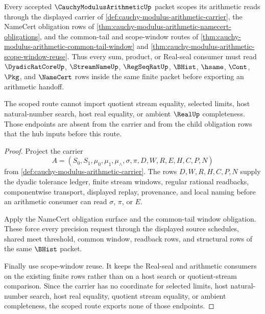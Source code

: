 \begin{theorem}
\label{thm:cauchy-modulus-arithmetic-scoped-route}
Every accepted $\CauchyModulusArithmeticUp$ packet scopes its arithmetic reads through the displayed carrier of \autoref{def:cauchy-modulus-arithmetic-carrier}, the NameCert obligation rows of \autoref{thm:cauchy-modulus-arithmetic-namecert-obligations}, and the common-tail and scope-window routes of \autoref{thm:cauchy-modulus-arithmetic-common-tail-window} and \autoref{thm:cauchy-modulus-arithmetic-scope-window-reuse}. Thus every sum, product, or Real-seal consumer must read $\DyadicRatCoreUp$, $\StreamNameUp$, $\RegSeqRatUp$, $\BHist$, $\hsame$, $\Cont$, $\Pkg$, and $\NameCert$ rows inside the same finite packet before exporting an arithmetic handoff.

The scoped route cannot import quotient stream equality, selected limits, host natural-number search, host real equality, or ambient $\RealUp$ completeness. Those endpoints are absent from the carrier and from the child obligation rows that the hub inputs before this route.
\end{theorem}
\begin{proof}
Project the carrier
$$
A=(S_0,S_1,\mu_0,\mu_1,\mu_{\wedge},\sigma,\pi,D,W,R,E,H,C,P,N)
$$
from \autoref{def:cauchy-modulus-arithmetic-carrier}. The rows $D,W,R,H,C,P,N$ supply the dyadic tolerance ledger, finite stream windows, regular rational readbacks, componentwise transport, displayed replay, provenance, and local naming before an arithmetic consumer can read $\sigma$, $\pi$, or $E$.

Apply the NameCert obligation surface and the common-tail window obligation. These force every precision request through the displayed source schedules, shared meet threshold, common window, readback rows, and structural rows of the same $\BHist$ packet.

Finally use scope-window reuse. It keeps the Real-seal and arithmetic consumers on the existing finite rows rather than on a host search or quotient-stream comparison. Since the carrier has no coordinate for selected limits, host natural-number search, host real equality, quotient stream equality, or ambient completeness, the scoped route exports none of those endpoints.
\end{proof}


